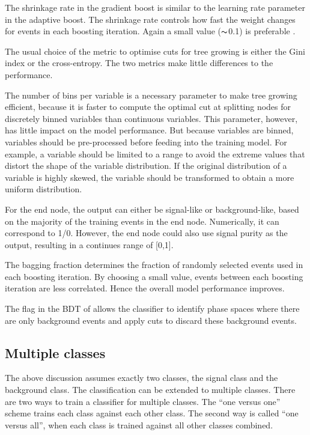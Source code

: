 The shrinkage rate in the gradient boost is similar to the learning rate parameter in the adaptive boost. The shrinkage rate controls how fast the weight changes for events in each boosting iteration. Again a small value   ($\thicksim$0.1) is preferable \cite{hastie2009elements}.

The usual choice of the metric to optimise cuts for tree growing is either the Gini index or the cross-entropy. The two metrics make  little differences to the performance.



The number of bins per variable is  a necessary parameter to make tree growing efficient, because it is faster to compute the optimal cut at splitting nodes for discretely binned variables than continuous variables. This parameter, however,  has little  impact on the model performance. But because variables are binned, variables should be pre-processed before feeding into the training model. For example, a variable should be limited to a range to avoid the extreme values that distort the shape of the variable distribution. If the original distribution of a variable is highly skewed, the variable should be transformed to obtain a more uniform distribution.

For the end node, the output can either be  signal-like or background-like, based on the majority of the training events in the end node. Numerically, it can correspond to 1/0. However, the end node could also use signal purity as the output, resulting in a continues range of [0,1].

The bagging fraction determines the fraction of randomly selected events used in each boosting iteration. By choosing a small value, events between each boosting iteration are less correlated. Hence the overall model performance improves.

The \DoPreSelection flag in the BDT of \TMVA allows the classifier to identify  phase spaces where there are only background events and apply cuts to discard these background events.

\subsection{Multiple classes}
\label{sec:pandoraMVAmulticlass}

The above discussion  assumes exactly two classes, the signal class and the background class. The classification can be extended to multiple classes. There are two ways to train a classifier for multiple classes. The ``one versus one'' scheme trains each class against each other class. The second way is called ``one versus all'', when each class is trained against all other classes combined.

